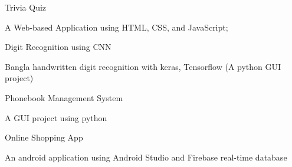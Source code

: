 
\begin{cventries}

  \cventry
    {} %
    {Trivia Quiz} %
    {} %
    {} %
    {
      \begin{cvitems} %
        \item {A Web-based Application using HTML, CSS, and JavaScript; {}
        }
      \end{cvitems}
    }

  \cventry
    {} %
    {Digit Recognition using CNN} %
    {} %
    {} %
    {
      \begin{cvitems} %
        \item {Bangla handwritten digit recognition with keras, Tensorflow (A python GUI project)}
      \end{cvitems}
    }

  \cventry
    {} %
    {Phonebook Management System} %
    {} %
    {} %
    {
      \begin{cvitems} %
        \item {A GUI project using python}
      \end{cvitems}
    }

  \cventry
    {} %
    {Online Shopping App} %
    {} %
    {} %
    {
      \begin{cvitems} %
        \item {An android application using Android Studio and Firebase real-time database}
      \end{cvitems}
    }



\end{cventries}
